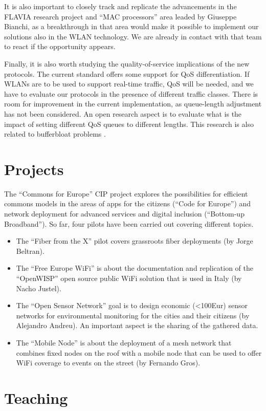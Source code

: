 \documentclass[a4paper,twocolumns]{article}%
\begin{document}
It is also important to closely track and replicate the advancements in the FLAVIA research project and ``MAC processors'' area leaded by Giuseppe Bianchi, as a breakthrough in that area would make it possible to implement our solutions also in the WLAN technology.
We are already in contact with that team to react if the opportunity appears.

Finally, it is also worth studying the quality-of-service implications of the new protocols.
The current standard offers some support for QoS differentiation.
If WLANs are to be used to support real-time traffic, QoS will be needed, and we have to evaluate our protocols in the presence of different traffic classes.
There is room for improvement in the current implementation, as queue-length adjustment has not been considered.
An open research aspect is to evaluate what is the impact of setting different QoS queues to different lengths.
This research is also related to bufferbloat problems \cite{nichols2012}.

\section{Projects}

The ``Commons for Europe'' CIP project explores the possibilities for efficient commons models in the areas of apps for the citizens (``Code for Europe'') and network deployment for advanced services and digital inclusion (``Bottom-up Broadband'').
So far, four pilots have been carried out covering different topics.
\begin{itemize}
\item The ``Fiber from the X'' pilot covers grassroots fiber deployments (by Jorge Beltran).
\item The ``Free Europe WiFi'' is about the documentation and replication of the ``OpenWISP'' open source public WiFi solution that is used in Italy (by Nacho Justel).
\item The ``Open Sensor Network'' goal is to design economic (<100Eur) sensor networks for environmental monitoring for the cities and their citizens (by Alejandro Andreu). 
An important aspect is the sharing of the gathered data.
\item The ``Mobile Node'' is about the deployment of a mesh network that combines fixed nodes on the roof with a mobile node that can be used to offer WiFi coverage to events on the street (by Fernando Gros).
\end{itemize}

\section{Teaching}
\end{document}
